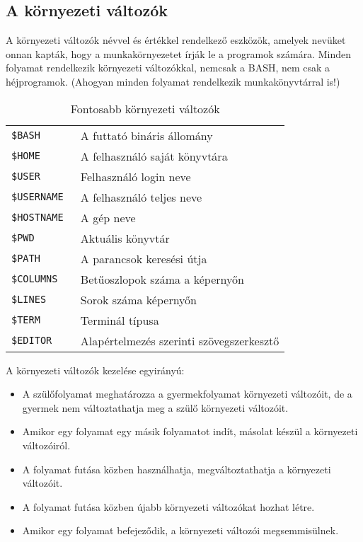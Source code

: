 \subsection{A környezeti változók}

A környezeti változók névvel és értékkel rendelkező eszközök, amelyek nevüket onnan kapták, hogy a munkakörnyezetet írják le a programok számára. Minden folyamat rendelkezik környezeti változókkal, nemcsak a BASH, nem csak a héjprogramok. 
(Ahogyan minden folyamat rendelkezik munkakönyvtárral is!)


\begin{table}[!h]
\centering\small
 \begin{tabular}{|ll|}
\hline
  \tt\$BASH	& A futtató bináris állomány
  \\
  \tt\$HOME	& A felhasználó saját könyvtára
  \\
  \tt\$USER	& Felhasználó login neve
  \\
\tt\$USERNAME	& A felhasználó teljes neve
  \\
  \tt\$HOSTNAME	& A gép neve
  \\
\tt\$PWD		& Aktuális könyvtár
  \\
  \tt\$PATH	& A parancsok keresési útja
  \\
  \tt\$COLUMNS	& Betűoszlopok száma a képernyőn
  \\
\tt\$LINES		& Sorok száma  képernyőn
  \\
\tt\$TERM		& Terminál típusa
  \\
\tt\$EDITOR	& Alapértelmezés szerinti szövegszerkesztő
  \\
\hline
 \end{tabular}
\caption{Fontosabb környezeti változók}
\end{table}
\clearpage

A környezeti változók kezelése egyirányú:
\begin{itemize}
\item A szülőfolyamat meghatározza a gyermekfolyamat környezeti változóit, de a
gyermek nem változtathatja meg a szülő környezeti változóit.
\item  Amikor egy folyamat egy másik folyamatot indít, másolat készül a környezeti
változóiról.
\item A folyamat futása közben használhatja, megváltoztathatja a környezeti változóit.
\item A folyamat futása közben újabb környezeti változókat hozhat létre.
\item Amikor egy folyamat befejeződik, a környezeti változói megsemmisülnek.
\end{itemize}



